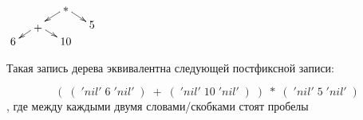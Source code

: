 \documentclass{article}
\begin{document}
\begin{center}
$\xymatrix@R=1pt@C=1em{
  &                 	    & \txt{*} \ar[dl] \ar[dr]        \\
  & \txt{+} \ar[dl] \ar[dr] &                 		  &  5   \\
6 &                   		& 10
}$
\end{center}
Такая запись дерева эквивалентна следующей постфиксной записи:

\[ (\;(\;'nil'\;6\;'nil'\;)\;+\;(\;'nil'\;10\;'nil'\;)\;)\;*\;(\;'nil'\;5\;'nil'\;)\], где между каждыми двумя словами/скобками стоят пробелы




\end{document}
